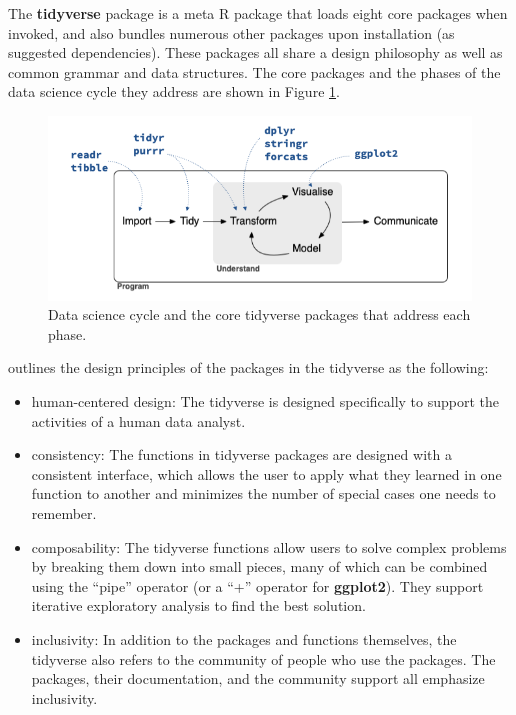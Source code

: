 \documentclass[12pt]{article}
\providecommand{\tightlist}{%
  \setlength{\itemsep}{0pt}\setlength{\parskip}{0pt}}
\begin{document}
The \textbf{tidyverse} package is a meta R package that loads eight core
packages when invoked, and also bundles numerous other packages upon
installation (as suggested dependencies). These packages all share a
design philosophy as well as common grammar and data structures. The
core packages and the phases of the data science cycle they address are
shown in Figure \ref{fig:data-science-cycle}.

\linespread{1}
\begin{figure}

{\centering \includegraphics[width=0.8\linewidth]{images/data-science} 

}

\caption{Data science cycle and the core tidyverse packages that address each phase.}\label{fig:data-science-cycle}
\end{figure}\linespread{2}
\vspace{3mm}\setlength{\parindent}{15pt}

\citet{tidyverse-style} outlines the design principles of the packages
in the tidyverse as the following:

\begin{itemize}
\tightlist
\item
  human-centered design: The tidyverse is designed specifically to
  support the activities of a human data analyst.
\item
  consistency: The functions in tidyverse packages are designed with a
  consistent interface, which allows the user to apply what they learned
  in one function to another and minimizes the number of special cases
  one needs to remember.
\item
  composability: The tidyverse functions allow users to solve complex
  problems by breaking them down into small pieces, many of which can be
  combined using the ``pipe'' operator (or a ``+'' operator for
  \textbf{ggplot2}). They support iterative exploratory analysis to find
  the best solution.
\item
  inclusivity: In addition to the packages and functions themselves, the
  tidyverse also refers to the community of people who use the packages.
  The packages, their documentation, and the community support all
  emphasize inclusivity.
\end{itemize}
\end{document}
